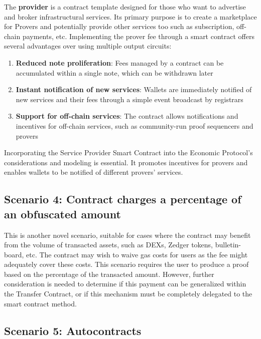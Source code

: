 \documentclass[twocolumn, nofootinbib]{revtex4-2}
\begin{document}
    The \textbf{provider} is a contract template designed for those who want to
    advertise and broker infrastructural services.
    Its primary purpose is to create a marketplace for Provers and potentially
    provide other services too such as subscription, off-chain payments, etc.
    Implementing the prover fee through a smart contract offers several
    advantages over using multiple output circuits:

    \begin{enumerate}
        \item \textbf{Reduced note proliferation}: Fees managed by a contract
              can be accumulated within a single note, which can be withdrawn
              later
        \item \textbf{Instant notification of new services}: Wallets are
              immediately notified of new services and their fees through a
              simple event broadcast by registrars
        \item \textbf{Support for off-chain services}: The contract allows
              notifications and incentives for off-chain services, such as
              community-run proof sequencers and provers
    \end{enumerate}

    Incorporating the Service Provider Smart Contract into the Economic
    Protocol's considerations and modeling is essential.
    It promotes incentives for provers and enables wallets to be notified of
    different provers' services.

    \subsection{Scenario 4: Contract charges a percentage of an obfuscated amount}\label{subsec:scenario-4}
    This is another novel scenario, suitable for cases where the contract may
    benefit from the volume of transacted assets, such as DEXs, Zedger tokens,
    bulletin-board, etc.
    The contract may wish to waive gas costs for users as the fee might
    adequately cover these costs.
    This scenario requires the user to produce a proof based on the percentage
    of the transacted amount.
    However, further consideration is needed to determine if this payment can
    be generalized within the Transfer Contract, or if this mechanism must be
    completely delegated to the smart contract method.

    \subsection{Scenario 5: Autocontracts}\label{subsec:scenario-5}
\end{document}
